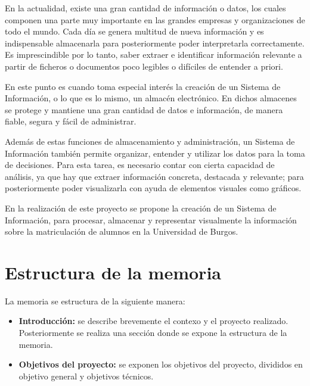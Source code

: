 

En la actualidad, existe una gran cantidad de información o datos, los cuales componen una parte muy importante en las grandes  empresas y organizaciones de todo el mundo.
Cada día se genera multitud de nueva información y es indispensable almacenarla para posteriormente poder interpretarla correctamente. Es imprescindible por lo tanto, saber extraer e identificar información relevante a partir de ficheros o documentos poco legibles o difíciles de entender a priori.


En este punto es cuando toma especial interés la creación de un Sistema de Información, o lo que es lo mismo, un almacén electrónico. En dichos almacenes se protege y mantiene una gran cantidad de datos e información, de manera fiable, segura y fácil de administrar.

Además de estas funciones de almacenamiento y administración, un Sistema de Información también permite organizar, entender y utilizar los datos para la toma de decisiones.
Para esta tarea, es necesario contar con cierta capacidad de análisis, ya que hay que extraer información concreta, destacada y relevante; para posteriormente poder visualizarla con ayuda de elementos visuales como gráficos.

En la realización de este proyecto se propone la creación de un Sistema de Información, para procesar, almacenar y representar visualmente la información sobre la matriculación de alumnos en la Universidad de Burgos. 



\section{Estructura de la memoria}\label{estructura-de-la-memoria}
La memoria se estructura de la siguiente manera:

\begin{itemize}
\item
\textbf{Introducción:} se describe brevemente el contexo y el proyecto realizado. Posteriormente se realiza una sección donde se expone la estructura de la memoria.
\item
\textbf{Objetivos del proyecto:} se exponen los objetivos del proyecto, divididos en objetivo general y objetivos técnicos.
\end{itemize}